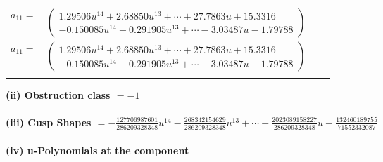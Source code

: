 \documentclass[1p]{elsarticle_modified}
\theoremstyle{definition}
\begin{document}
\begin{tabular}{m{7pt} m{180pt} m{7pt} m{180pt} }
\flushright $a_{11}=$&$\begin{pmatrix}1.29506 u^{14}+2.68850 u^{13}+\cdots+27.7863 u+15.3316\\-0.150085 u^{14}-0.291905 u^{13}+\cdots-3.03487 u-1.79788\end{pmatrix}$\\ \flushright $a_{11}=$&$\begin{pmatrix}1.29506 u^{14}+2.68850 u^{13}+\cdots+27.7863 u+15.3316\\-0.150085 u^{14}-0.291905 u^{13}+\cdots-3.03487 u-1.79788\end{pmatrix}$\\&\end{tabular}
\flushleft \textbf{(ii) Obstruction class $= -1$}\\~\\
\flushleft \textbf{(iii) Cusp Shapes $= -\frac{127706987601}{286209328348} u^{14}-\frac{268342154629}{286209328348} u^{13}+\cdots-\frac{2023089158227}{286209328348} u-\frac{132460189755}{71552332087}$}\\~\\
\newpage\renewcommand{\arraystretch}{1}
\flushleft \textbf{(iv) u-Polynomials at the component}\newline \\
\end{document}
